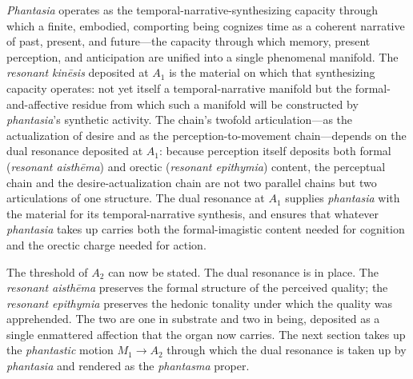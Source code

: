 \documentclass{article}
\begin{document}
\textit{Phantasia} operates as the temporal-narrative-synthesizing capacity through which a finite, embodied, comporting being cognizes time as a coherent narrative of past, present, and future---the capacity through which memory, present perception, and anticipation are unified into a single phenomenal manifold. The \textit{resonant kinēsis} deposited at $A_1$ is the material on which that synthesizing capacity operates: not yet itself a temporal-narrative manifold but the formal-and-affective residue from which such a manifold will be constructed by \textit{phantasia}'s synthetic activity. The chain's twofold articulation---as the actualization of desire and as the perception-to-movement chain---depends on the dual resonance deposited at $A_1$: because perception itself deposits both formal (\textit{resonant aisthēma}) and orectic (\textit{resonant epithymia}) content, the perceptual chain and the desire-actualization chain are not two parallel chains but two articulations of one structure. The dual resonance at $A_1$ supplies \textit{phantasia} with the material for its temporal-narrative synthesis, and ensures that whatever \textit{phantasia} takes up carries both the formal-imagistic content needed for cognition and the orectic charge needed for action.

The threshold of $A_2$ can now be stated. The dual resonance is in place. The \textit{resonant aisthēma} preserves the formal structure of the perceived quality; the \textit{resonant epithymia} preserves the hedonic tonality under which the quality was apprehended. The two are one in substrate and two in being, deposited as a single enmattered affection that the organ now carries. The next section takes up the \textit{phantastic} motion $M_1 \rightarrow A_2$ through which the dual resonance is taken up by \textit{phantasia} and rendered as the \textit{phantasma} proper.
\end{document}
